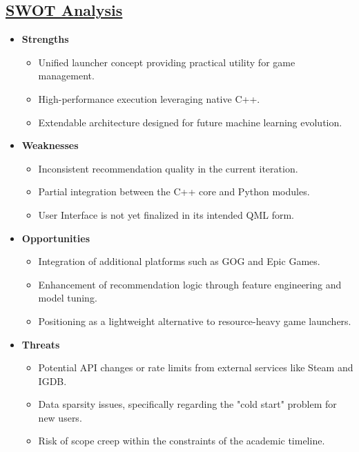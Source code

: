 \subsection{\underline{SWOT Analysis}}
\begin{itemize}
    \item \textbf{Strengths}
    \begin{itemize}
        \item Unified launcher concept providing practical utility for game management.
        \item High-performance execution leveraging native C++.
        \item Extendable architecture designed for future machine learning evolution.
    \end{itemize}
    \item \textbf{Weaknesses}
    \begin{itemize}
        \item Inconsistent recommendation quality in the current iteration.
        \item Partial integration between the C++ core and Python modules.
        \item User Interface is not yet finalized in its intended QML form.
    \end{itemize}
    \item \textbf{Opportunities}
    \begin{itemize}
        \item Integration of additional platforms such as GOG and Epic Games.
        \item Enhancement of recommendation logic through feature engineering and model tuning.
        \item Positioning as a lightweight alternative to resource-heavy game launchers.
    \end{itemize}
    \item \textbf{Threats}
    \begin{itemize}
        \item Potential API changes or rate limits from external services like Steam and IGDB.
        \item Data sparsity issues, specifically regarding the "cold start" problem for new users.
        \item Risk of scope creep within the constraints of the academic timeline.
    \end{itemize}
\end{itemize}


